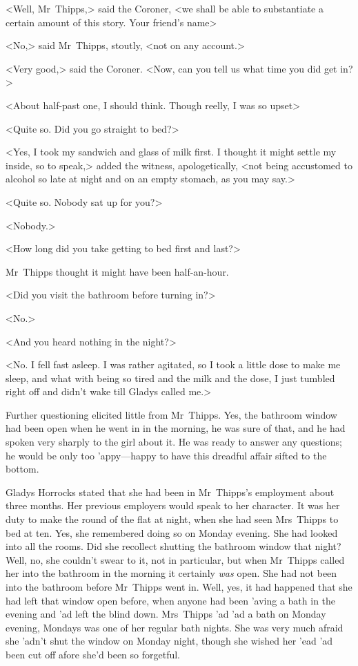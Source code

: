 <Well, Mr~Thipps,> said the Coroner, <we shall be able to substantiate a certain amount of this story. Your friend's name\longdash>

<No,> said Mr~Thipps, stoutly, <not on any account.>

<Very good,> said the Coroner. <Now, can you tell us what time you did get in?>

<About half-past one, I should think. Though reelly, I was so upset\longdash>

<Quite so. Did you go straight to bed?>

<Yes, I took my sandwich and glass of milk first. I thought it might settle my inside, so to speak,> added the witness, apologetically, <not being accustomed to alcohol so late at night and on an empty stomach, as you may say.>

<Quite so. Nobody sat up for you?>

<Nobody.>

<How long did you take getting to bed first and last?>

Mr~Thipps thought it might have been half-an-hour.

<Did you visit the bathroom before turning in?>

<No.>

<And you heard nothing in the night?>

<No. I fell fast asleep. I was rather agitated, so I took a little dose to make me sleep, and what with being so tired and the milk and the dose, I just tumbled right off and didn't wake till Gladys called me.>

Further questioning elicited little from Mr~Thipps. Yes, the bathroom window had been open when he went in in the morning, he was sure of that, and he had spoken very sharply to the girl about it. He was ready to answer any questions; he would be only too 'appy—happy to have this dreadful affair sifted to the bottom.

Gladys Horrocks stated that she had been in Mr~Thipps's employment about three months. Her previous employers would speak to her character. It was her duty to make the round of the flat at night, when she had seen Mrs~Thipps to bed at ten. Yes, she remembered doing so on Monday evening. She had looked into all the rooms. Did she recollect shutting the bathroom window that night? Well, no, she couldn't swear to it, not in particular, but when Mr~Thipps called her into the bathroom in the morning it certainly \emph{was} open. She had not been into the bathroom before Mr~Thipps went in. Well, yes, it had happened that she had left that window open before, when anyone had been 'aving a bath in the evening and 'ad left the blind down. Mrs~Thipps 'ad 'ad a bath on Monday evening, Mondays was one of her regular bath nights. She was very much afraid she 'adn't shut the window on Monday night, though she wished her 'ead 'ad been cut off afore she'd been so forgetful.

